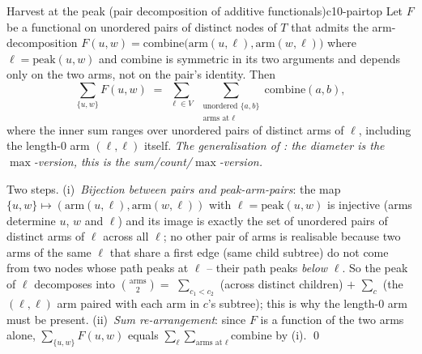 \begin{proposition}{Harvest at the peak (pair decomposition of additive functionals)}{c10-pairtop}
Let $F$ be a functional on unordered pairs of distinct nodes of $T$ that
admits the arm-decomposition
$F(u,w)=\mathrm{combine}\!\big(\mathrm{arm}(u,\ell),\mathrm{arm}(w,\ell)\big)$
where $\ell=\mathrm{peak}(u,w)$ and $\mathrm{combine}$ is symmetric in its
two arguments and depends only on the two arms, not on the pair's identity.
Then
\[
  \sum_{\{u,w\}} F(u,w)
  \;=\;
  \sum_{\ell\in V}\;\sum_{\substack{\text{unordered }\{a,b\}\\ \text{arms at }\ell}} \mathrm{combine}(a,b),
\]
where the inner sum ranges over unordered pairs of distinct arms of $\ell$,
including the length-$0$ arm $(\ell,\ell)$ itself. \emph{The
generalisation of : the diameter is the $\max$-version,
this is the sum/count/$\max$-version.}
\end{proposition}
\begin{proofbox}
Two steps. (i)~\emph{Bijection between pairs and peak-arm-pairs}: the map
$\{u,w\}\mapsto(\mathrm{arm}(u,\ell),\mathrm{arm}(w,\ell))$ with
$\ell=\mathrm{peak}(u,w)$ is injective (arms determine $u$, $w$ and $\ell$)
and its image is exactly the set of unordered pairs of distinct arms of
$\ell$ across all $\ell$; no other pair of arms is realisable because two
arms of the same $\ell$ that share a first edge (same child subtree) do not
come from two nodes whose path peaks at $\ell$ -- their path peaks
\emph{below} $\ell$. So the peak of $\ell$ decomposes into
$\binom{\text{arms}}{2}=$ $\sum_{c_1<c_2}$ (across distinct children)
$+$ $\sum_{c}$ (the $(\ell,\ell)$ arm paired with each arm in $c$'s
subtree); this is why the length-$0$ arm must be present.
(ii)~\emph{Sum re-arrangement}: since $F$ is a function of the two arms
alone, $\sum_{\{u,w\}} F(u,w)$ equals $\sum_\ell \sum_{\text{arms at }\ell}\mathrm{combine}$
by (i). \qed
\end{proofbox}

